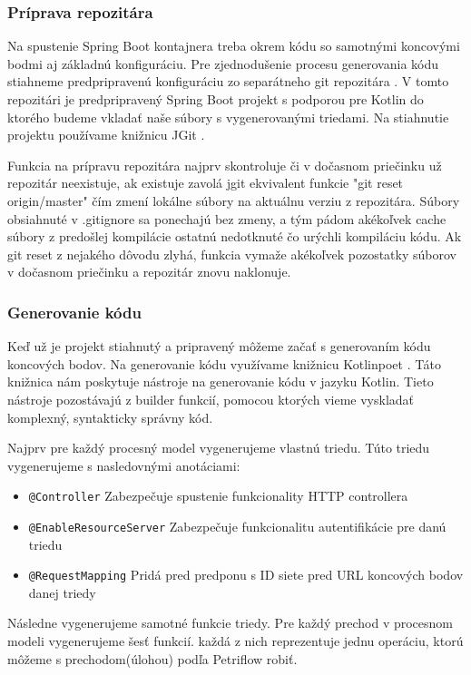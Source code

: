 \subsubsection{Príprava repozitára}
Na spustenie Spring Boot kontajnera treba okrem kódu so samotnými koncovými bodmi aj základnú konfiguráciu. Pre zjednodušenie procesu generovania kódu stiahneme predpripravenú konfiguráciu zo separátneho git repozitára \cite{dp_relay}. V tomto repozitári je predpripravený Spring Boot projekt s podporou pre Kotlin do ktorého budeme vkladať naše súbory s vygenerovanými triedami. Na stiahnutie projektu používame knižnicu JGit \cite{jgit}.

Funkcia na prípravu repozitára najprv skontroluje či v dočasnom priečinku už repozitár neexistuje, ak existuje zavolá jgit ekvivalent funkcie "git reset origin/master" čím zmení lokálne súbory na aktuálnu verziu z repozitára. Súbory obsiahnuté v .gitignore sa ponechajú bez zmeny, a tým pádom akékoľvek cache súbory z predošlej kompilácie ostatnú nedotknuté čo urýchli kompiláciu kódu. Ak git reset z nejakého dôvodu zlyhá, funkcia vymaže akékoľvek pozostatky súborov v dočasnom priečinku a repozitár znovu naklonuje.

\subsubsection{Generovanie kódu}
Keď už je projekt stiahnutý a pripravený môžeme začať s generovaním kódu koncových bodov. Na generovanie kódu  využívame knižnicu Kotlinpoet \cite{kotlinpoet}. Táto knižnica nám poskytuje nástroje na generovanie kódu v jazyku Kotlin. Tieto nástroje pozostávajú z builder funkcií, pomocou ktorých vieme vyskladať komplexný, syntakticky správny kód.

Najprv pre každý procesný model vygenerujeme vlastnú triedu. Túto triedu vygenerujeme s nasledovnými anotáciami:

\begin{itemize}
\item \texttt{@Controller} Zabezpečuje spustenie funkcionality HTTP controllera
\item \texttt{@EnableResourceServer} Zabezpečuje funkcionalitu  autentifikácie pre danú triedu
\item \texttt{@RequestMapping} Pridá pred predponu s ID siete pred URL koncových bodov danej triedy
\end{itemize}

Následne vygenerujeme samotné funkcie triedy. Pre každý prechod v procesnom modeli vygenerujeme šesť funkcií. každá z nich reprezentuje jednu operáciu, ktorú môžeme s prechodom(úlohou) podľa Petriflow robiť.

